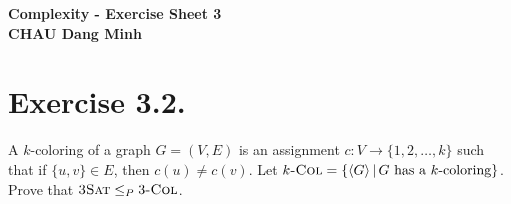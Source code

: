 \begin{center}
  {\bf
    \vspace{0.9cm}
    Complexity - Exercise Sheet 3\\
    \vspace{0.2cm}
    CHAU Dang Minh
  }
\end{center}

\section{Exercise 3.2.} A $k$-coloring of a graph $G=(V,E)$ is an assignment $c: V\to \{1,2,\ldots,k\}$ such that if $\{u,v\}\in E$, then $c(u)\neq c(v)$. Let $\textsc{$k$-Col} = \{\langle G\rangle \,|\, G \text{ has a } k\text{-coloring}\}$. Prove that $\textsc{3Sat}\le_P \textsc{$3$-Col}$.

